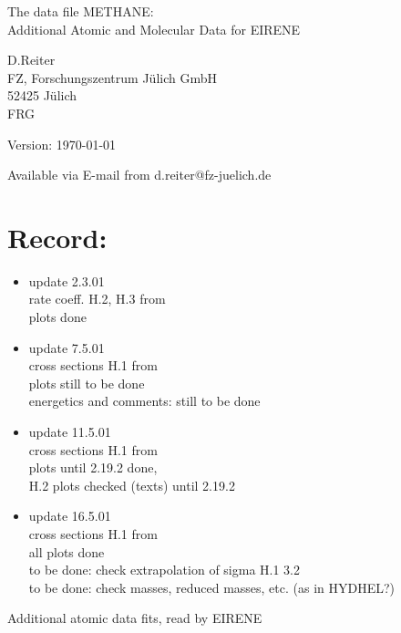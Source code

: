 \documentclass[12pt]{article}
\begin{document}
\parindent 0pt
{\LARGE \bf \center
\vspace*{3truecm}

The data file METHANE: \\
Additional Atomic and Molecular Data for EIRENE
\vspace*{3truecm}

D.Reiter \\
FZ, Forschungszentrum J\"ulich GmbH \\
52425 J\"ulich \\
FRG
\vspace{5truecm}

Version: \today
\vspace{3truecm}

Available via E-mail from d.reiter@fz-juelich.de
}
\tableofcontents
\newpage

\section{Record:}
\begin{itemize}
\item update  2.3.01 \\
   rate coeff. H.2, H.3 from \cite{kn:Ehrhardt} \\
   plots done 
 \item update 7.5.01 \\
   cross sections H.1 from \cite{kn:Ehrhardt} \\
   plots still to be done \\
   energetics and comments: still to be done
 \item update 11.5.01 \\
   cross sections H.1 from \cite{kn:Ehrhardt} \\
   plots until 2.19.2 done, \\
   H.2 plots checked (texts)  until 2.19.2
 \item update 16.5.01 \\
   cross sections H.1 from \cite{kn:Ehrhardt} \\
   all plots done \\
   to be done: check extrapolation of sigma H.1  3.2 \\
   to be done: check masses, reduced masses, etc. (as in HYDHEL?)
\end{itemize}

\newpage
Additional atomic data fits, read by EIRENE
\end{document}
